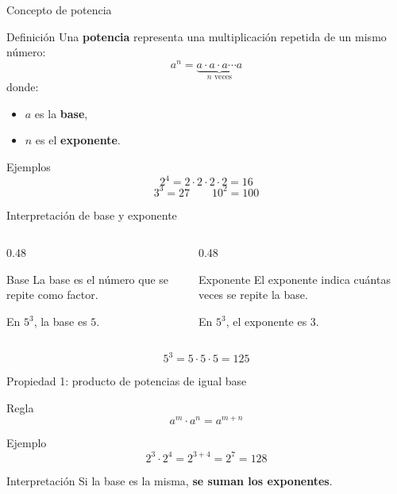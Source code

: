 \documentclass[aspectratio=169,10pt,handout]{beamer}
\newcommand{\destacar}[1]{\textcolor{USTBlueDark}{\textbf{#1}}}
\newcommand{\pp}{\pause}
\begin{document}
	\begin{frame}{Concepto de potencia}
		\begin{block}{Definición}
			Una \destacar{potencia} representa una multiplicación repetida de un mismo número:
			\[
			a^n=\underbrace{a\cdot a\cdot a\cdots a}_{n\text{ veces}}
			\]
			donde:
			\begin{itemize}
				\item \(a\) es la \destacar{base},
				\item \(n\) es el \destacar{exponente}.
			\end{itemize}
		\end{block}
		
		\pp
		
		\begin{exampleblock}{Ejemplos}
			\[
			2^4=2\cdot2\cdot2\cdot2=16
			\]
			\[
			3^3=27
			\qquad
			10^2=100
			\]
		\end{exampleblock}
	\end{frame}
	
	\begin{frame}{Interpretación de base y exponente}
		\begin{columns}[T,totalwidth=\textwidth]
			\begin{column}{0.48\textwidth}
				\begin{block}{Base}
					La base es el número que se repite como factor.
					
					En \(5^3\), la base es \(5\).
				\end{block}
			\end{column}
			\begin{column}{0.48\textwidth}
				\begin{exampleblock}{Exponente}
					El exponente indica cuántas veces se repite la base.
					
					En \(5^3\), el exponente es \(3\).
				\end{exampleblock}
			\end{column}
		\end{columns}
		
		\vspace{0.3cm}
		\[
		5^3 = 5\cdot5\cdot5=125
		\]
	\end{frame}
	
	\begin{frame}{Propiedad 1: producto de potencias de igual base}
		\begin{block}{Regla}
			\[
			a^m\cdot a^n = a^{m+n}
			\]
		\end{block}
		
		\begin{exampleblock}{Ejemplo}
			\[
			2^3\cdot2^4 = 2^{3+4}=2^7=128
			\]
		\end{exampleblock}
		
		\begin{alertblock}{Interpretación}
			Si la base es la misma, \destacar{se suman los exponentes}.
		\end{alertblock}
	\end{frame}
	
\end{document}
